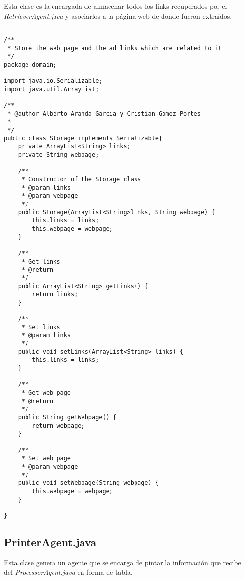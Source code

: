 \documentclass{pre-tfg}
\begin{document}
Esta clase es la encargada de almacenar todos los links recuperados por el \textit{RetrieverAgent.java} y asociarlos a la página web
de donde fueron extraídos.

\begin{lstlisting}[caption=Código que almacena los links junto a la página web de donde fueron recuperados,style=java]

/**
 * Store the web page and the ad links which are related to it
 */
package domain;

import java.io.Serializable;
import java.util.ArrayList;

/**
 * @author Alberto Aranda Garcia y Cristian Gomez Portes
 *
 */
public class Storage implements Serializable{
	private ArrayList<String> links;
	private String webpage;
	
	/**
	 * Constructor of the Storage class
	 * @param links
	 * @param webpage
	 */
	public Storage(ArrayList<String>links, String webpage) {
		this.links = links;
		this.webpage = webpage;
	}
	
	/**
	 * Get links
	 * @return
	 */
	public ArrayList<String> getLinks() {
		return links;
	}
	
	/**
	 * Set links
	 * @param links
	 */
	public void setLinks(ArrayList<String> links) {
		this.links = links;
	}
	
	/**
	 * Get web page
	 * @return
	 */
	public String getWebpage() {
		return webpage;
	}
	
	/**
	 * Set web page
	 * @param webpage
	 */
	public void setWebpage(String webpage) {
		this.webpage = webpage;
	}
	
}

\end{lstlisting}

\subsection{PrinterAgent.java}

Esta clase genera un agente que se encarga de pintar la información que recibe del \textit{ProcessorAgent.java} en forma de tabla.
\end{document}
